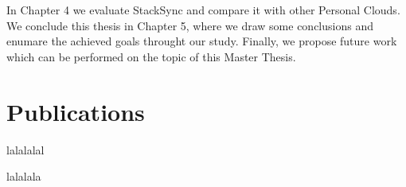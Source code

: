 In Chapter 4 we evaluate StackSync and compare it with other Personal Clouds. We conclude this thesis in Chapter 5, where we draw some conclusions and enumare the achieved goals throught our study. Finally, we propose future work which can be performed on the topic of this Master Thesis.

\section{Publications}

lalalalal

lalalala